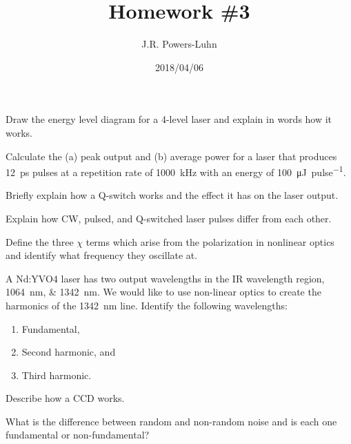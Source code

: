 \documentclass{hw}
\title{Homework \#3}
\author{J.R. Powers-Luhn}
\date{2018/04/06}
\begin{document}
\problem{}

Draw the energy level diagram for a 4-level laser and explain in words how it works.

\solution



\problem{}

Calculate the (a) peak output and (b) average power for a laser that produces \SI{12}{\pico\second} pulses at a repetition rate of \SI{1000}{\kilo\hertz} with an energy of \SI{100}{\micro\joule\per pulse}.

\solution



\problem{}

Briefly explain how a Q-switch works and the effect it has on the laser output.

\solution



\problem{}

Explain how CW, pulsed, and Q-switched laser pulses differ from each other.

\solution



\problem{}

Define the three $\chi$ terms which arise from the polarization in nonlinear optics and identify what frequency they oscillate at.

\solution



\problem{}

A Nd:YVO4 laser has two output wavelengths in the IR wavelength region, \SIlist{1064;1342}{\nano\meter}. We would like to use non-linear optics to create the harmonics of the \SI{1342}{\nano\meter} line. Identify the following wavelengths:
\begin{enumerate}
    \item Fundamental,
    \item Second harmonic, and
    \item Third harmonic.
\end{enumerate}

\solution



\problem{}

Describe how a CCD works.

\solution



\problem{}

What is the difference between random and non-random noise and is each one fundamental or non-fundamental?
\end{document}
